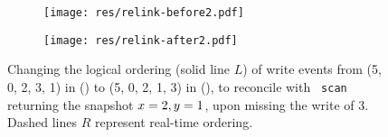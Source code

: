 \begin{figure}
\begin{subfigure}[t]{0.48\textwidth}
\texttt{[image: res/relink-before2.pdf]}
\caption{\label{fig:reorder:before}} %
\end{subfigure} \hfill
\begin{subfigure}[t]{0.48\textwidth}
\texttt{[image: res/relink-after2.pdf]}
\caption{\label{fig:reorder:after}} %
\end{subfigure}%
%
\caption{\label{fig:reorder} Changing the logical ordering (solid line $L$) of write
  events from (5, 0, 2, 3, 1) in () to (5,
  0, 2, 1, 3) in (), to reconcile with {\tt
    scan} returning the snapshot $x=2, y=1$, upon missing the write
  of $3$. Dashed lines $R$ represent real-time ordering.}
\end{figure}
